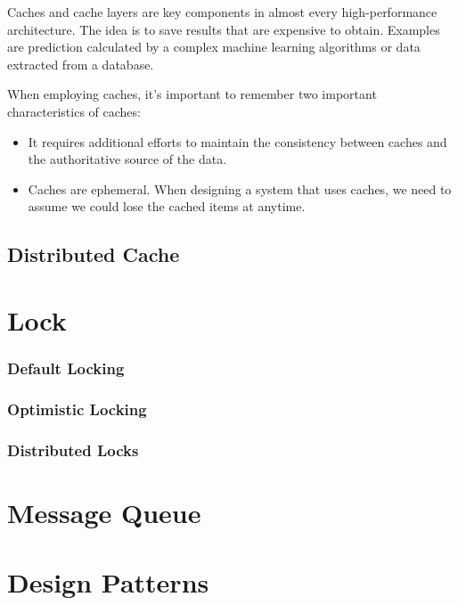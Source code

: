 \documentclass[letterpaper, oneside]{book}
\begin{document}
Caches and cache layers are key components in almost every high-performance architecture. The idea is to save results that are expensive to obtain. Examples are prediction calculated by a complex machine learning algorithms or data extracted from a database.

When employing caches, it's important to remember two important characteristics of caches:
\begin{itemize}
    \item It requires additional efforts to maintain the consistency between caches and the authoritative source of the data.
    \item Caches are ephemeral. When designing a system that uses caches, we need to assume we could lose the cached items at anytime.
\end{itemize}

\section{Distributed Cache}


\chapter{Lock}

\subsection{Default Locking}

\subsection{Optimistic Locking}

\subsection{Distributed Locks}

\chapter{Message Queue}


\chapter{Design Patterns}
\end{document}
